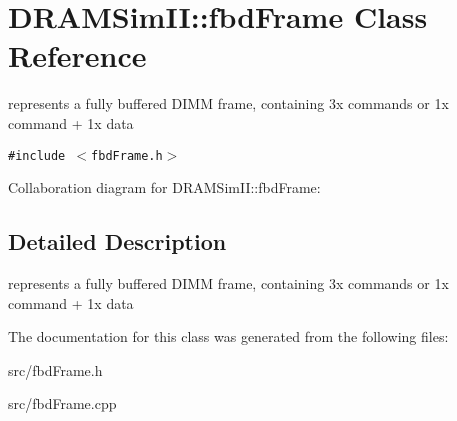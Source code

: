 \section{DRAMSimII::fbdFrame Class Reference}
\label{class_d_r_a_m_sim_i_i_1_1fbd_frame}
represents a fully buffered DIMM frame, containing 3x commands or 1x command + 1x data  


{\tt \#include $<$fbdFrame.h$>$}

Collaboration diagram for DRAMSimII::fbdFrame:

\subsection{Detailed Description}
represents a fully buffered DIMM frame, containing 3x commands or 1x command + 1x data 

The documentation for this class was generated from the following files:\begin{CompactItemize}
\item 
src/fbdFrame.h\item 
src/fbdFrame.cpp\end{CompactItemize}

